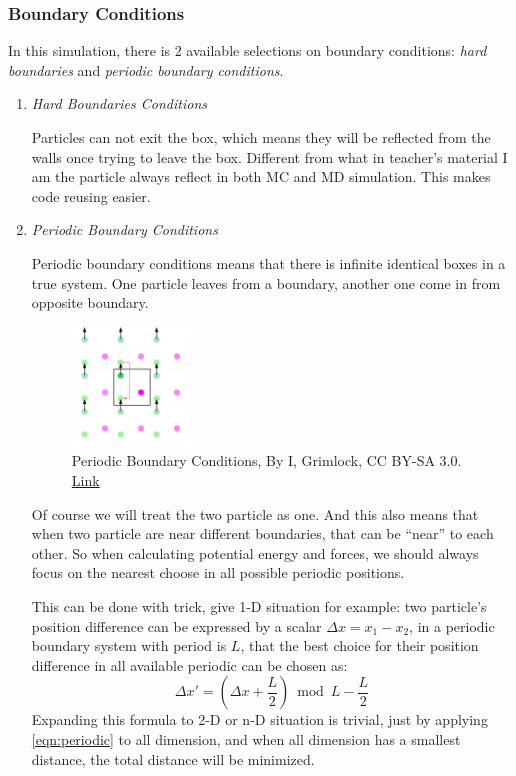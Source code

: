 \documentclass[UTF8,a4paper]{article}
\begin{document}
\subsubsection{Boundary Conditions}
In this simulation, there is 2 available selections on boundary conditions: \textit{hard boundaries} and \textit{periodic boundary conditions}.
\begin{enumerate}
	\item \textit{Hard Boundaries Conditions}

	      Particles can not exit the box, which means they will be reflected from the walls once trying to leave the box. Different from what in teacher's material
	      I am the particle always reflect in both MC and MD simulation. This makes code reusing easier.
	\item \textit{Periodic Boundary Conditions}

	      Periodic boundary conditions means that there is infinite identical boxes in a true system. One particle leaves from a boundary, another one come in from opposite
	      boundary.
	      \begin{figure}[h]
		      \centering
		      \includegraphics[width=0.3\textwidth]{fig/1024px-Limiteperiodicite.png}
		      \caption{Periodic Boundary Conditions, By I, Grimlock, CC BY-SA 3.0. \href{https://commons.wikimedia.org/wiki/File:Limiteperiodicite.svg}{Link}}
		      \label{fig:Periodic}
	      \end{figure}
	      Of course we will treat the two particle as one. And this also means that when two particle are near different boundaries, that can be ``near'' to each other. So when calculating
	      potential energy and forces, we should always focus on the nearest choose in all possible periodic positions.

	      This can be done with trick, give 1-D situation for example: two particle's position difference can be expressed by a scalar $\Delta x = x_1 - x_2$, in a periodic boundary system with
	      period is $L$, that the best choice for their position difference in all available periodic can be chosen as:
	      \begin{equation}
		      \Delta x' = \left(\Delta x + \frac{L}{2}\right)\bmod L - \frac{L}{2}
		      \label{eqn:periodic}
	      \end{equation}
	      Expanding this formula to 2-D or n-D situation is trivial, just by applying \eqref{eqn:periodic} to all dimension, and when all dimension has a smallest distance, the total distance will
	      be minimized.


\end{enumerate}
\end{document}
